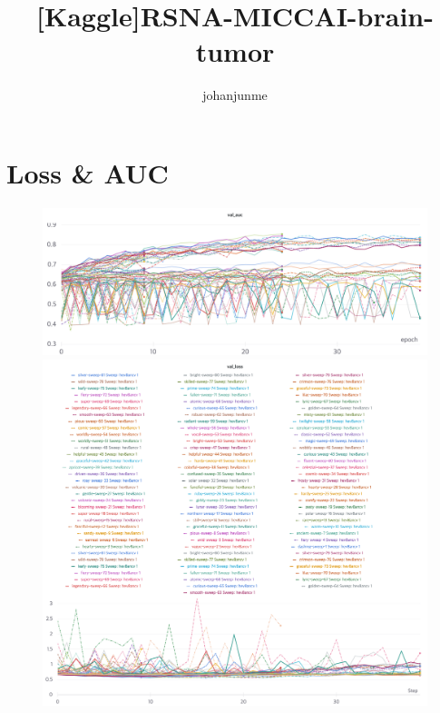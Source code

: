 \documentclass{article}
\title{[Kaggle]RSNA-MICCAI-brain-tumor}
\author{%
johanjunme
}
\begin{document}
\maketitle

\section{Loss & AUC}

\begin{figure}[!htb]
\includegraphics[width=\linewidth]{charts/Section-1-Panel-0-9e8trlbd0}
\caption{}
\endminipage\hfill
{}
\includegraphics[width=\linewidth]{charts/Section-1-Panel-1-1c3dayraz}
\caption{}
\endminipage
\end{figure}
\end{document}
